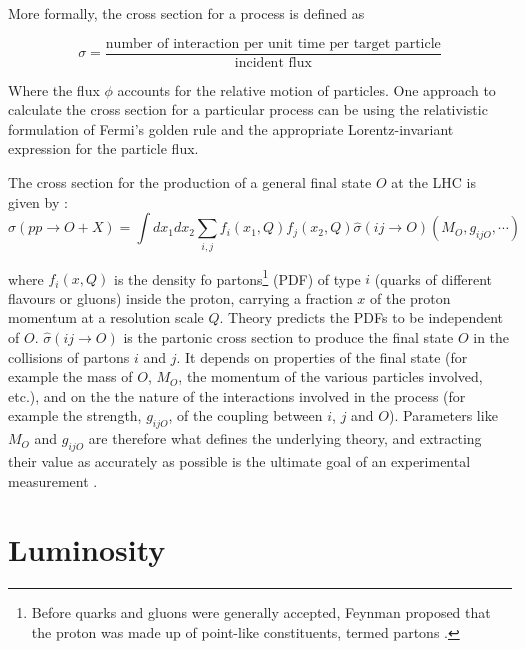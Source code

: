 More formally, the cross section for a process is defined as

\begin{equation}
\sigma=\frac{\text{number of interaction per unit time per target particle}}{\text{incident flux}}
\end{equation}

Where the flux $\phi$ accounts for the relative motion of particles.
One approach to calculate the cross section for a particular process can be using the relativistic formulation of Fermi’s golden rule and the appropriate Lorentz-invariant expression for the particle flux.

The cross section for the production of a general final state $O$ at the LHC is given by \cite{lumi_motiv}:
\begin{equation}
  \sigma (pp\rightarrow O +X)= \int dx_{1} dx_{2} \sum_{i,j} f_{i} (x_{1},Q) f_{j}(x_{2},Q) \hat{\sigma}(ij \rightarrow O)(M_{O},g_{ijO}, \cdots)
 \label{cs_theo}
\end{equation}

where $f_{i}(x,Q)$ is the density fo partons\footnote{Before quarks and gluons were generally accepted, Feynman proposed that the proton was made up of point-like constituents, termed partons \cite{thomson_2013}.} (PDF) of type $i$ (quarks of different flavours or gluons) inside the proton, carrying a fraction $x$ of the proton momentum at a resolution scale $Q$. Theory predicts the PDFs to be independent of $O$. $\hat{\sigma}(ij \rightarrow O)$ is the partonic cross section to produce the final state $O$ in the collisions of partons $i$ and $j$. It depends on properties of the final state (for example the mass of $O$, $M_{O}$, the momentum of the various particles involved, etc.), and on the the nature of the interactions involved in the process (for example the strength, $g_{ijO}$, of the coupling between $i$, $j$ and $O$). Parameters like $M_{O}$ and $g_{ijO}$ are therefore what defines the underlying theory, and extracting their value as accurately as possible is the ultimate goal of an experimental measurement \cite{lumi_motiv}.


\section{Luminosity }

